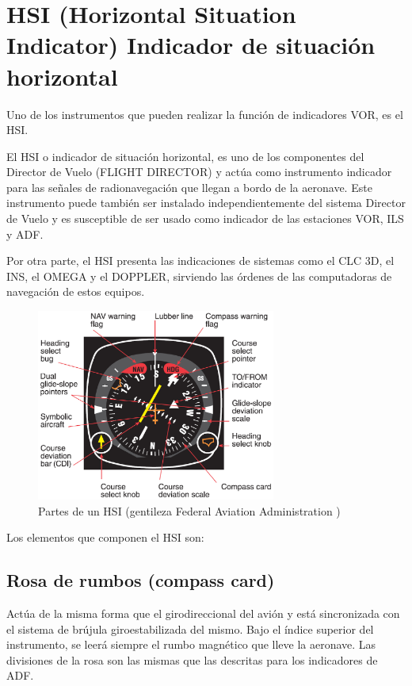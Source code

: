 
\section{HSI (Horizontal Situation Indicator) Indicador de situación horizontal}

Uno de los instrumentos que pueden realizar la función de indicadores VOR, es el HSI.

El HSI o indicador de situación horizontal, es uno de los componentes del Director de Vuelo (FLIGHT DIRECTOR) y actúa como instrumento indicador para las señales de radionavegación que llegan a bordo de la aeronave. Este instrumento puede también ser instalado independientemente del sistema Director de Vuelo y es susceptible de ser usado como indicador de las estaciones VOR, ILS y ADF.

Por otra parte, el HSI presenta las indicaciones de sistemas como el CLC 3D, el INS, el OMEGA y el DOPPLER, sirviendo las órdenes de las computadoras de navegación de estos equipos.


\begin{figure}[!h]
  \centering
  \includegraphics[keepaspectratio,width=0.7\textwidth]{Imagenes/06.02.vor.imagenes/Wiki-HSI.eps}
  \caption{Partes de un HSI (gentileza Federal Aviation Administration )}
  \label{fig:HSI-partes}
\end{figure}

Los elementos que componen el HSI son:

\subsection{Rosa de rumbos (compass card) }

Actúa de la misma forma que el girodireccional del avión y está sincronizada con el sistema de brújula giroestabilizada del mismo. Bajo el índice superior del instrumento, se leerá siempre el rumbo magnético que lleve la aeronave. Las divisiones de la rosa son las mismas que las descritas para los indicadores de ADF.

